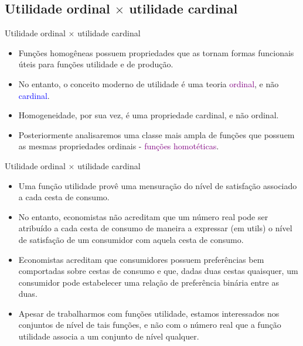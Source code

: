 \documentclass[10pt]{beamer}
\begin{document}
\subsection{Utilidade ordinal $\times$ utilidade cardinal}
\begin{frame}{Utilidade ordinal $\times$ utilidade cardinal}
    \begin{itemize}
        \item Funções homogêneas possuem propriedades que as tornam formas funcionais úteis para funções utilidade e de produção.
        \bigskip
        \item No entanto, o conceito moderno de utilidade é uma teoria \textcolor{purple}{ordinal}, e não \textcolor{blue}{cardinal}.
        \bigskip
        \item Homogeneidade, por sua vez, é uma propriedade cardinal, e não ordinal.
        \bigskip
        \item Posteriormente analisaremos uma classe mais ampla de funções que possuem as mesmas propriedades ordinais - \textcolor{purple}{funções homotéticas}.
    \end{itemize}    
\end{frame}

\begin{frame}{Utilidade ordinal $\times$ utilidade cardinal}
    \begin{itemize}
        \item Uma função utilidade provê uma mensuração do nível de satisfação associado a cada cesta de consumo.
        \bigskip
        \item No entanto, economistas não acreditam que um número real pode ser atribuído a cada cesta de consumo de maneira a expressar (em utils) o nível de satisfação de um consumidor com aquela cesta de consumo.
        \bigskip
        \item Economistas acreditam que consumidores possuem preferências bem comportadas sobre cestas de consumo e que, dadas duas cestas quaisquer, um consumidor pode estabelecer uma relação de preferência binária entre as duas.
        \bigskip
        \item Apesar de trabalharmos com funções utilidade, estamos interessados nos conjuntos de nível de tais funções, e não com o número real que a função utilidade associa a um conjunto de nível qualquer.
    \end{itemize}    
\end{frame}
\end{document}

